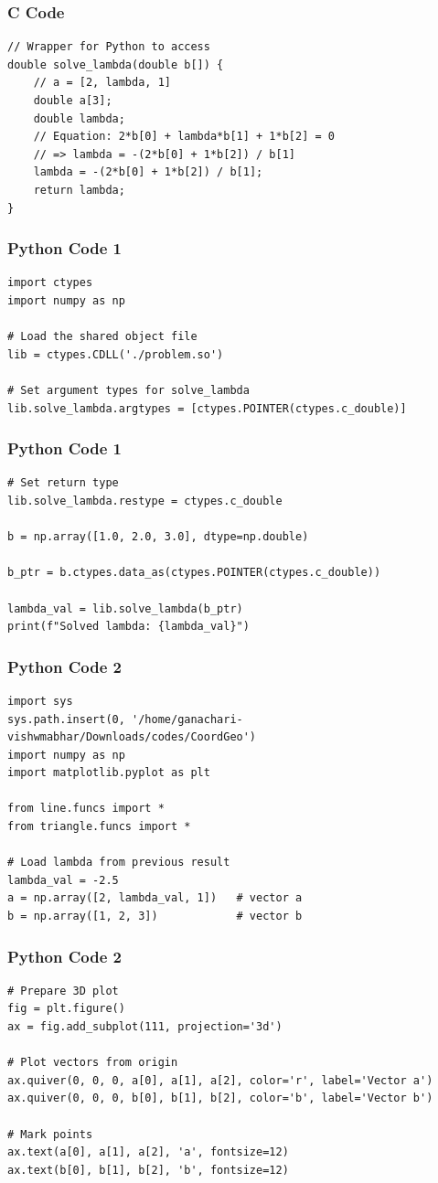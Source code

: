 \documentclass{beamer}
\begin{document}
\begin{frame}[fragile]
    \frametitle{C Code}
    \begin{lstlisting}
// Wrapper for Python to access
double solve_lambda(double b[]) {
    // a = [2, lambda, 1]
    double a[3];
    double lambda;
    // Equation: 2*b[0] + lambda*b[1] + 1*b[2] = 0
    // => lambda = -(2*b[0] + 1*b[2]) / b[1]
    lambda = -(2*b[0] + 1*b[2]) / b[1];
    return lambda;
}
    \end{lstlisting}
\end{frame}

\begin{frame}[fragile]
    \frametitle{Python Code 1}
    \begin{lstlisting}
import ctypes
import numpy as np

# Load the shared object file
lib = ctypes.CDLL('./problem.so')

# Set argument types for solve_lambda
lib.solve_lambda.argtypes = [ctypes.POINTER(ctypes.c_double)]
    \end{lstlisting}
\end{frame}

\begin{frame}[fragile]
    \frametitle{Python Code 1}
    \begin{lstlisting}
# Set return type
lib.solve_lambda.restype = ctypes.c_double

b = np.array([1.0, 2.0, 3.0], dtype=np.double)

b_ptr = b.ctypes.data_as(ctypes.POINTER(ctypes.c_double))

lambda_val = lib.solve_lambda(b_ptr)
print(f"Solved lambda: {lambda_val}")
    \end{lstlisting}
\end{frame}

\begin{frame}[fragile]
    \frametitle{Python Code 2}
    \begin{lstlisting}
import sys
sys.path.insert(0, '/home/ganachari-vishwmabhar/Downloads/codes/CoordGeo')
import numpy as np
import matplotlib.pyplot as plt

from line.funcs import *
from triangle.funcs import *

# Load lambda from previous result
lambda_val = -2.5
a = np.array([2, lambda_val, 1])   # vector a
b = np.array([1, 2, 3])            # vector b
    \end{lstlisting}
\end{frame}

\begin{frame}[fragile]
    \frametitle{Python Code 2}
    \begin{lstlisting}
# Prepare 3D plot
fig = plt.figure()
ax = fig.add_subplot(111, projection='3d')

# Plot vectors from origin
ax.quiver(0, 0, 0, a[0], a[1], a[2], color='r', label='Vector a')
ax.quiver(0, 0, 0, b[0], b[1], b[2], color='b', label='Vector b')

# Mark points
ax.text(a[0], a[1], a[2], 'a', fontsize=12)
ax.text(b[0], b[1], b[2], 'b', fontsize=12)
    \end{lstlisting}
\end{frame}
\end{document}
